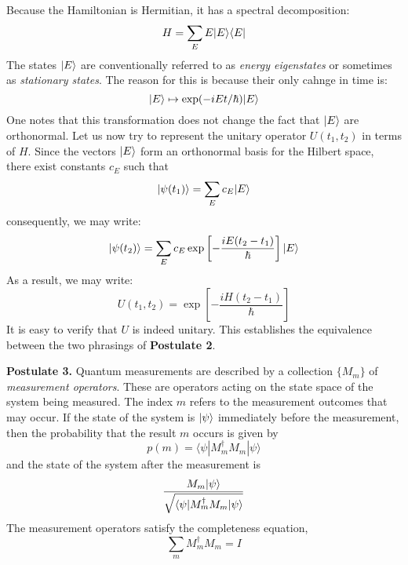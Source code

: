 Because the Hamiltonian is Hermitian, it has a spectral decomposition:
\begin{equation*}
    H = \sum_E E|E\rangle\langle E|
\end{equation*}
The states $|E\rangle$ are conventionally referred to as \textit{energy eigenstates} or sometimes as \textit{stationary states}. The reason for this is because their only cahnge in time is:
\begin{equation*}
    |E\rangle \mapsto \exp(-iEt/\hbar)|E\rangle
\end{equation*}
One notes that this transformation does not change the fact that $|E\rangle$ are orthonormal. Let us now try to represent the unitary operator $U(t_1,t_2)$ in terms of $H$. Since the vectors $|E\rangle$ form an orthonormal basis for the Hilbert space, there exist constants $c_E$ such that 
\begin{equation*}
    |\psi(t_1)\rangle = \sum_Ec_E|E\rangle
\end{equation*}
consequently, we may write:
\begin{equation*}
    |\psi(t_2)\rangle = \sum_Ec_E\exp\left[-\frac{iE(t_2-t_1)}{\hbar}\right]|E\rangle
\end{equation*}
As a result, we may write:
\begin{equation*}
    U(t_1,t_2) = \exp\left[-\frac{iH(t_2-t_1)}{\hbar}\right]
\end{equation*}
It is easy to verify that $U$ is indeed unitary. This establishes the equivalence between the two phrasings of \textbf{Postulate 2}.

\begin{mdframed}
    \textbf{Postulate 3.} Quantum measurements are described by a collection $\{M_m\}$ of \textit{measurement operators}. These are operators acting on the state space of the system being measured. The index $m$ refers to the measurement outcomes that may occur. If the state of the system is $|\psi\rangle$ immediately before the measurement, then the probability that the result $m$ occurs is given by 
    \begin{equation*}
        p(m) = \langle\psi|M_m^\dagger M_m|\psi\rangle
    \end{equation*}
    and the state of the system after the measurement is 
    \begin{equation*}
        \frac{M_m|\psi\rangle}{\sqrt{\langle\psi|M_m^\dagger M_m|\psi\rangle}}
    \end{equation*}
    The measurement operators satisfy the completeness equation,
    \begin{equation*}
        \sum_m M_m^\dagger M_m = I
    \end{equation*}
\end{mdframed}

